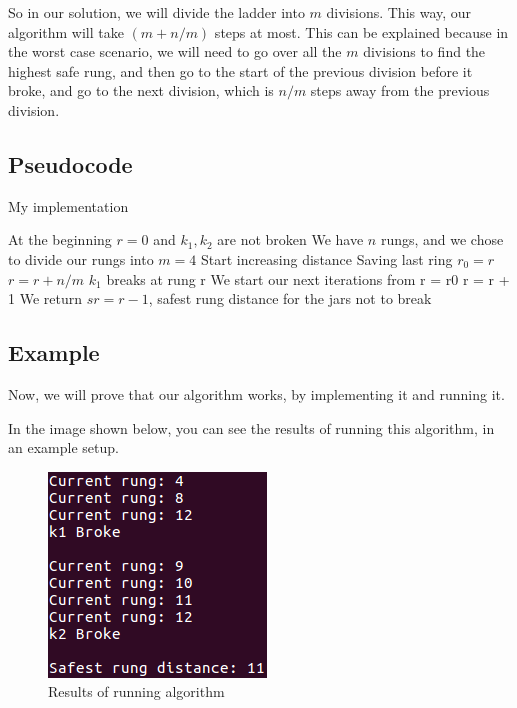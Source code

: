 \documentclass{article}
\begin{document}
So in our solution, we will divide the ladder into $m$ divisions. This way, our algorithm will take $(m+n/m)$ steps at most. This can be explained because in the worst case scenario, we will need to go over all the $m$ divisions to find the highest safe rung, and then go to the start of the previous division before it broke, and go to the next division, which is $n/m$ steps away from the previous division.

\subsection*{Pseudocode}

\begin{algorithm}[H]
\caption{My implementation}
\begin{algorithmic}[1]
\State At the beginning $r = 0$ and $k_1,k_2$ are not broken
\State We have $n$ rungs, and we chose to divide our rungs into $m = 4$
 \State Start increasing distance
 \State Saving last ring $r_0 = r$
 \State $r = r + n/m$
  \State $k_1$ breaks at rung r
 \EndIf
\EndWhile
\State We start our next iterations from r = r0
 \State r = r + 1
  \State We return $sr = r-1$, safest rung distance for the jars not to break
 \EndIf 
\EndWhile
\end{algorithmic}
\end{algorithm}

\subsection*{Example}

Now, we will prove that our algorithm works, by implementing it and running it.



In the image shown below, you can see the results of running this algorithm, in an example setup.

\begin{figure}[H]
\begin{center}
\includegraphics[scale=.8]{problem1a}
\end{center}
\caption{Results of running algorithm}
\end{figure}
\end{document}
